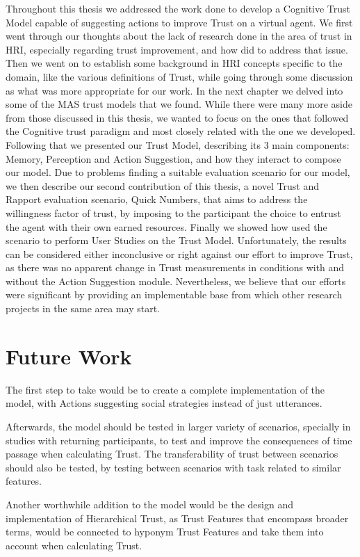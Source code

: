 \label{chap:Conclusions}
Throughout this thesis we addressed the work done to develop a Cognitive Trust Model capable of suggesting actions to improve Trust on a virtual agent. We first went through our thoughts about the lack of research done in the area of trust in \ac{HRI}, especially regarding trust improvement, and how did to address that issue. Then we went on to establish some background in \ac{HRI} concepts specific to the domain, like the various definitions of Trust, while going through some discussion as what was more appropriate for our work. In the next chapter we delved into some of the MAS trust models that we found. While there were many more aside from those discussed in this thesis, we wanted to focus on the ones that followed the Cognitive trust paradigm and most closely related with the one we developed. Following that we presented our Trust Model, describing its 3 main components: Memory, Perception and Action Suggestion, and how they interact to compose our model. Due to problems finding a suitable evaluation scenario for our model, we then describe our second contribution of this thesis, a novel Trust and Rapport evaluation scenario, Quick Numbers, that aims to address the willingness factor of trust, by imposing to the participant the choice to entrust the agent with their own earned resources. Finally we showed how used the scenario to perform User Studies on the Trust Model. Unfortunately, the results can be considered either inconclusive or right against our effort to improve Trust, as there was no apparent change in Trust measurements in conditions with and without the Action Suggestion module. Nevertheless, we believe that our efforts were significant by providing an implementable base from which other research projects in the same area may start. 


\section{Future Work}
The first step to take would be to create a complete implementation of the model, with Actions suggesting social strategies instead of just utterances. 

Afterwards, the model should be tested in larger variety of scenarios, specially in studies with returning participants, to test and improve the consequences of time passage when calculating Trust. The transferability of trust between scenarios should also be tested, by testing between scenarios with task related to similar features.

Another worthwhile addition to the model would be the design and implementation of Hierarchical Trust, as Trust Features that encompass broader terms, would be connected to hyponym Trust Features and take them into account when calculating Trust.